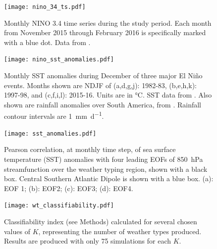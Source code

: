 \documentclass{article}
\begin{document}
\begin{figure}
	\texttt{[image: nino\_34\_ts.pdf]}
	\caption{
		Monthly NINO 3.4 time series during the study period.
		Each month from November 2015 through February 2016 is specifically marked with a blue dot.
		Data from \citet{Kaplan1998}.
	}
\end{figure}

\begin{figure}
	\texttt{[image: nino\_sst\_anomalies.pdf]}
	\caption{
		Monthly SST anomalies during December of three major El Ni\~{n}o events.
		Months shown are NDJF of (a,d,g,j): 1982-83, (b,e,h,k): 1997-98, and (c,f,i,l): 2015-16.
		Units are in \si{\celsius}.
		SST data from \citet{Reynolds2002}.
		Also shown are rainfall anomalies over South America, from \citet{Xie2010}.
		Rainfall contour intervals are \SI{1}{\milli\meter\per\day}.
	}
\end{figure}

\begin{figure}
	\noindent\texttt{[image: sst\_anomalies.pdf]}
	\caption{
		Pearson correlation, at monthly time step, of  sea surface temperature (SST) anomalies \citep{Reynolds2002} with four leading EOFs of \SI{850}{\hecto\pascal} streamfunction over the weather typing region, shown with a black box.
		Central Southern Atlantic Dipole is shown with a blue box.
		(a): EOF 1; (b): EOF2; (c): EOF3; (d): EOF4.
	}\label{fig:sst-anomalies}
\end{figure}


\begin{figure}
	\texttt{[image: wt\_classifiability.pdf]}
	\caption{
		Classifiability index (see Methods) calculated for several chosen values of $K$, representing the number of weather types produced.
		Results are produced with only 75 simulations for each $K$.
	}
\end{figure}

\clearpage


\end{document}
